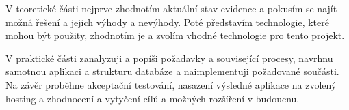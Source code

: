 V teoretické části nejprve zhodnotím aktuální stav evidence a pokusím se najít možná řešení a jejich výhody a nevýhody. Poté představím technologie, které mohou být použity, zhodnotím je a zvolím vhodné technologie pro tento projekt.

V praktické části zanalyzuji a popíši požadavky a související procesy, navrhnu samotnou aplikaci a strukturu databáze a naimplementuji požadované součásti. Na závěr proběhne akceptační testování, nasazení výsledné aplikace na zvolený hosting a zhodnocení a vytyčení cílů a možných rozšíření v budoucnu.